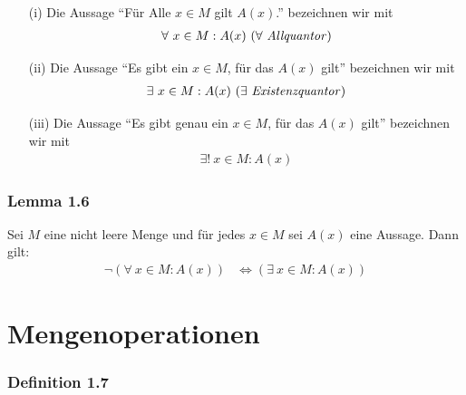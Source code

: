 \documentclass[a5paper, 10pt]{book}
\makeatletter
\newcommand{\keyword}[1]{\emph{#1}\index{#1@\textbf{#1}}}
\renewcommand{\keyword}[1]{\keywordUnwichitg{#1}}
\newcommand{\keywordUnwichitg}[1]{\emph{#1}\index{#1}}
\makeatother
\begin{document}
						\begin{itemize}
							\item[(i)] Die Aussage ``Für Alle $x\in M$ gilt $A(x)$.'' bezeichnen wir mit
								\begin{align}
									\forall\ x\in M: A(x)\ \text{($\forall$ \keyword{Allquantor}\index{Quantoren!Allquantor})}
								\end{align}
						\item[(ii)] Die Aussage ``Es gibt ein $x\in M$, für das $A(x)$ gilt'' bezeichnen wir mit
							\begin{align}
								\exists\ x\in M: A(x)\ \text{($\exists$ \keyword{Existenzquantor}\index{Quantoren!Existenzquantor})}
							\end{align} 
						\item[(iii)] Die Aussage ``Es gibt genau ein $x\in M$, für das $A(x)$ gilt'' bezeichnen wir mit
							\begin{align}
								\exists!\ x\in M: A(x)
							\end{align}
						\end{itemize}
					
					\subsubsection{Lemma 1.6}
						Sei $M$ eine nicht leere Menge und für jedes $x\in M$ sei $A(x)$ eine Aussage. Dann gilt:
						\begin{align}
							\neg\left(\forall\ x\in M: A(x)\right) &\Leftrightarrow \left(\exists\ x\in M: A(x)\right)
						\end{align}
						
						
			\section{Mengenoperationen}
					\subsubsection{Definition 1.7}
					
\end{document}
